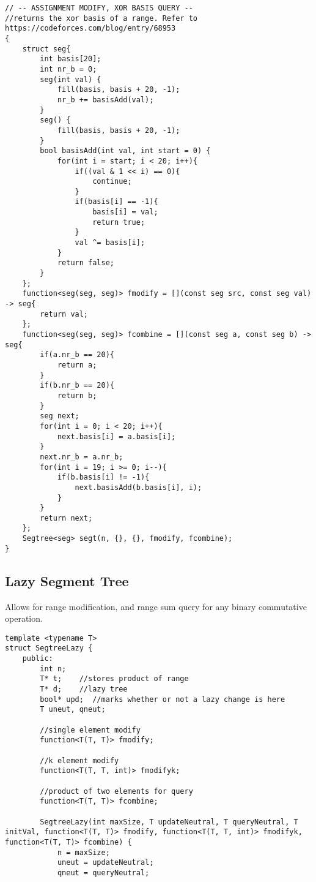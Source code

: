 \documentclass[8pt, headheight=10pt, a4paper]{article}
\begin{document}
\begin{multicols*}{3}
\begin{lstlisting}
// -- ASSIGNMENT MODIFY, XOR BASIS QUERY --
//returns the xor basis of a range. Refer to https://codeforces.com/blog/entry/68953
{   
    struct seg{
        int basis[20];
        int nr_b = 0;
        seg(int val) {
            fill(basis, basis + 20, -1);
            nr_b += basisAdd(val);
        }
        seg() {
            fill(basis, basis + 20, -1);
        }
        bool basisAdd(int val, int start = 0) {
            for(int i = start; i < 20; i++){
                if((val & 1 << i) == 0){
                    continue;
                }
                if(basis[i] == -1){
                    basis[i] = val;
                    return true;
                }
                val ^= basis[i];
            }
            return false;
        }
    };
    function<seg(seg, seg)> fmodify = [](const seg src, const seg val) -> seg{
        return val;
    };
    function<seg(seg, seg)> fcombine = [](const seg a, const seg b) -> seg{
        if(a.nr_b == 20){
            return a;
        }
        if(b.nr_b == 20){
            return b;
        }
        seg next;
        for(int i = 0; i < 20; i++){
            next.basis[i] = a.basis[i];
        }
        next.nr_b = a.nr_b;
        for(int i = 19; i >= 0; i--){
            if(b.basis[i] != -1){
                next.basisAdd(b.basis[i], i);
            }
        }
        return next;
    };
    Segtree<seg> segt(n, {}, {}, fmodify, fcombine);
}
\end{lstlisting}

\subsection{Lazy Segment Tree}
Allows for range modification, and range sum query for any binary commutative operation. 
\begin{lstlisting}
template <typename T>
struct SegtreeLazy {
    public:
        int n;
        T* t;    //stores product of range
        T* d;    //lazy tree
        bool* upd;  //marks whether or not a lazy change is here
        T uneut, qneut;

        //single element modify
        function<T(T, T)> fmodify;

        //k element modify
        function<T(T, T, int)> fmodifyk;

        //product of two elements for query
        function<T(T, T)> fcombine;

        SegtreeLazy(int maxSize, T updateNeutral, T queryNeutral, T initVal, function<T(T, T)> fmodify, function<T(T, T, int)> fmodifyk, function<T(T, T)> fcombine) {
            n = maxSize;
            uneut = updateNeutral;
            qneut = queryNeutral;


\end{lstlisting}
\end{multicols*}
\end{document}

